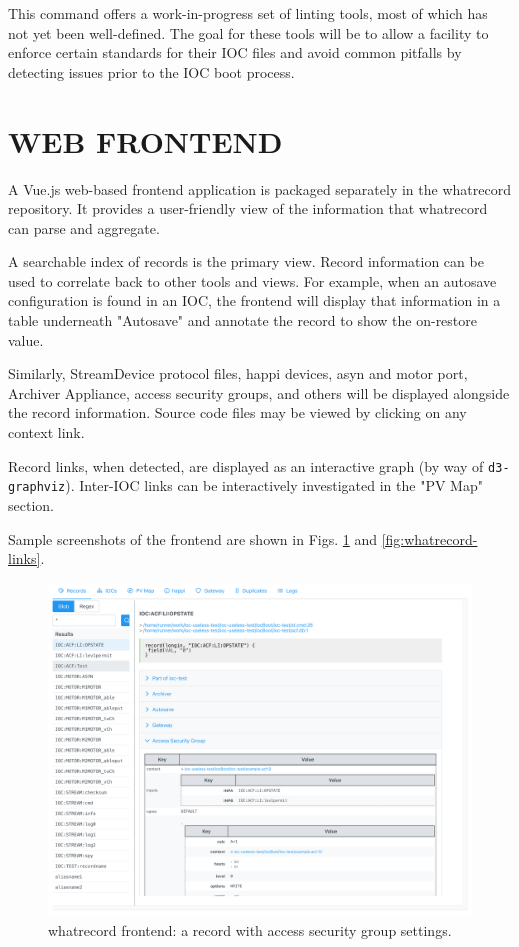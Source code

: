 \documentclass[letter,
               keeplastbox,   %
               ]{jacow}
\begin{document}
This command offers a work-in-progress set of linting tools, most of which
has not yet been well-defined.  The goal for these tools will be to
allow a facility to enforce certain standards for their IOC files
and avoid common pitfalls by detecting issues prior to the IOC boot process.

\section{WEB FRONTEND}

A Vue.js\cite{vuejs} web-based frontend application is packaged separately in
the whatrecord repository.  It provides a user-friendly view of the information
that whatrecord can parse and aggregate.

A searchable index of records is the primary view.  Record information can be
used to correlate back to other tools and views. For example, when an autosave
configuration is found in an IOC, the frontend will display that information in
a table underneath "Autosave" and annotate the record to show the on-restore
value.

Similarly, StreamDevice protocol files, happi devices, asyn and motor port,
Archiver Appliance, access security groups, and others will be displayed
alongside the record information.  Source code files may be viewed by
clicking on any context link.

Record links, when detected, are displayed as an interactive graph (by way of
\verb_d3-graphviz_\cite{d3graphviz}).  Inter-IOC links can be interactively
investigated in the "PV Map" section.

Sample screenshots of the frontend are shown in Figs. \ref{fig:whatrecord-asg}
and \ref{fig:whatrecord-links}.

\begin{figure}
   \centering
   \includegraphics*[width=.9\columnwidth]{whatrecord-asg}
   \caption{whatrecord frontend: a record with access security group settings.}
   \label{fig:whatrecord-asg}
\end{figure}
\end{document}
